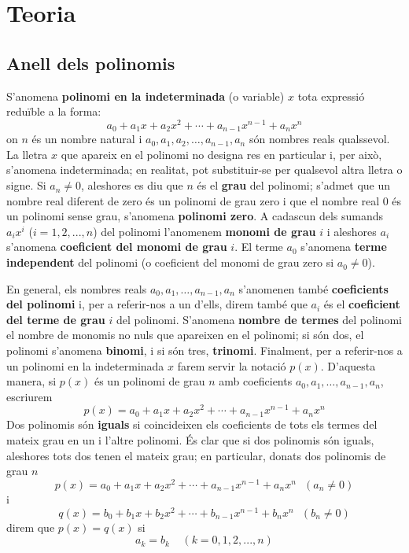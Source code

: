 \chapter{Teoria}
\label{cap:teoria}

\section{Anell dels polinomis}

S'anomena \textbf{polinomi en la indeterminada} (o variable) $x$ tota
expressió reduïble a la forma:
\begin{equation*}
a_{0}+a_{1}x+a_{2}x^{2}+\cdots +a_{n-1}x^{n-1}+a_{n}x^{n}
\end{equation*}
on $n$ és un nombre natural i $a_{0},a_{1},a_{2},\ldots,a_{n-1},a_{n}$
són nombres reals qualssevol. La lletra $x$ que apareix en el
polinomi no designa res en particular i, per això, s’anomena
indeterminada; en realitat, pot substituir-se per qualsevol altra lletra o
signe. Si $a_{n}\neq 0$, aleshores es diu que $n$ és el \textbf{grau }del
polinomi; s'admet que un nombre real diferent de zero és un polinomi
de grau zero i que el nombre real $0$ és un polinomi sense grau, s'anomena \textbf{polinomi zero}. A cadascun dels sumands $a_{i}x^{i}$ ($i=1,2,...,n$) del polinomi l'anomenem \textbf{monomi de grau} $i$ i
aleshores $a_{i}$ s’anomena \textbf{coeficient del monomi de grau} $i$. El terme $a_{0}$ s'anomena \textbf{terme independent} del polinomi (o
coeficient del monomi de grau zero si $a_{0}\neq 0$).

En general, els nombres reals $a_{0},a_{1},\ldots,a_{n-1},a_{n}$ s'anomenen també \textbf{coeficients del polinomi} i, per a referir-nos a un d'ells, direm també que $a_{i}$ és el \textbf{coeficient del terme de grau} $i$ del polinomi. S'anomena \textbf{nombre de termes} del polinomi el nombre de monomis no nuls que apareixen en el
polinomi; si són dos, el polinomi s’anomena \textbf{binomi}, i si són
tres, \textbf{trinomi}. Finalment, per a referir-nos a un polinomi en la
indeterminada $x$ farem servir la notació $p(x)$. D'aquesta manera, si $p(x)$ és un polinomi de grau $n$ amb coeficients $a_{0},a_{1},\ldots,a_{n-1},a_{n}$, escriurem
\begin{equation*}
p(x)=a_{0}+a_{1}x+a_{2}x^{2}+\cdots +a_{n-1}x^{n-1}+a_{n}x^{n}
\end{equation*}
Dos polinomis són \textbf{iguals} si coincideixen els coeficients de tots
els termes del mateix grau en un i l'altre polinomi. És clar que si
dos polinomis són iguals, aleshores tots dos tenen el mateix grau; en
particular, donats dos polinomis de grau $n$
\begin{equation*}
p(x)=a_{0}+a_{1}x+a_{2}x^{2}+\cdots +a_{n-1}x^{n-1}+a_{n}x^{n}~\ \
(a_{n}\neq 0)
\end{equation*}i\begin{equation*}
q(x)=b_{0}+b_{1}x+b_{2}x^{2}+\cdots +b_{n-1}x^{n-1}+b_{n}x^{n}~\ \
(b_{n}\neq 0)
\end{equation*}direm que $p(x)=q(x)$ si
\begin{equation*}
a_{k}=b_{k}~\ \ \ \ (k=0,1,2,...,n)
\end{equation*}

